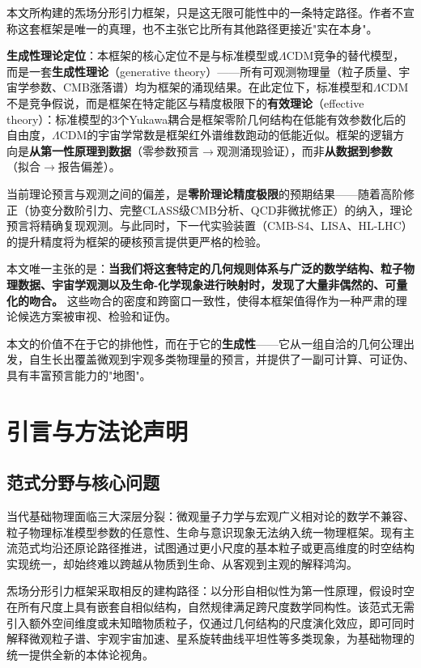 \documentclass[12pt,a4paper,twocolumn]{article}
\begin{document}
本文所构建的炁场分形引力框架，只是这无限可能性中的一条特定路径。作者不宣称这套框架是唯一的真理，也不主张它比所有其他路径更接近"实在本身"。

\textbf{生成性理论定位}：本框架的核心定位不是与标准模型或$\Lambda$CDM竞争的替代模型，而是一套\textbf{生成性理论}（generative theory）——所有可观测物理量（粒子质量、宇宙学参数、CMB涨落谱）均为框架的涌现结果。在此定位下，标准模型和$\Lambda$CDM不是竞争假说，而是框架在特定能区与精度极限下的\textbf{有效理论}（effective theory）：标准模型的3个Yukawa耦合是框架零阶几何结构在低能有效参数化后的自由度，$\Lambda$CDM的宇宙学常数是框架红外谱维数跑动的低能近似。框架的逻辑方向是\textbf{从第一性原理到数据}（零参数预言$\to$观测涌现验证），而非\textbf{从数据到参数}（拟合$\to$报告偏差）。

当前理论预言与观测之间的偏差，是\textbf{零阶理论精度极限}的预期结果——随着高阶修正（协变分数阶引力、完整CLASS级CMB分析、QCD非微扰修正）的纳入，理论预言将精确复现观测。与此同时，下一代实验装置（CMB-S4、LISA、HL-LHC）的提升精度将为框架的硬核预言提供更严格的检验。

本文唯一主张的是：\textbf{当我们将这套特定的几何规则体系与广泛的数学结构、粒子物理数据、宇宙学观测以及生命-化学现象进行映射时，发现了大量非偶然的、可量化的吻合。} 这些吻合的密度和跨窗口一致性，使得本框架值得作为一种严肃的理论候选方案被审视、检验和证伪。

本文的价值不在于它的排他性，而在于它的\textbf{生成性}——它从一组自洽的几何公理出发，自生长出覆盖微观到宇观多类物理量的预言，并提供了一副可计算、可证伪、具有丰富预言能力的"地图"。

\vspace{1em}

\section{引言与方法论声明}

\subsection{范式分野与核心问题}
当代基础物理面临三大深层分裂：微观量子力学与宏观广义相对论的数学不兼容、粒子物理标准模型参数的任意性、生命与意识现象无法纳入统一物理框架。现有主流范式均沿还原论路径推进，试图通过更小尺度的基本粒子或更高维度的时空结构实现统一，却始终难以跨越从物质到生命、从客观到主观的解释鸿沟。

炁场分形引力框架采取相反的建构路径：以分形自相似性为第一性原理，假设时空在所有尺度上具有嵌套自相似结构，自然规律满足跨尺度数学同构性。该范式无需引入额外空间维度或未知暗物质粒子，仅通过几何结构的尺度演化效应，即可同时解释微观粒子谱、宇观宇宙加速、星系旋转曲线平坦性等多类现象，为基础物理的统一提供全新的本体论视角。
\end{document}

